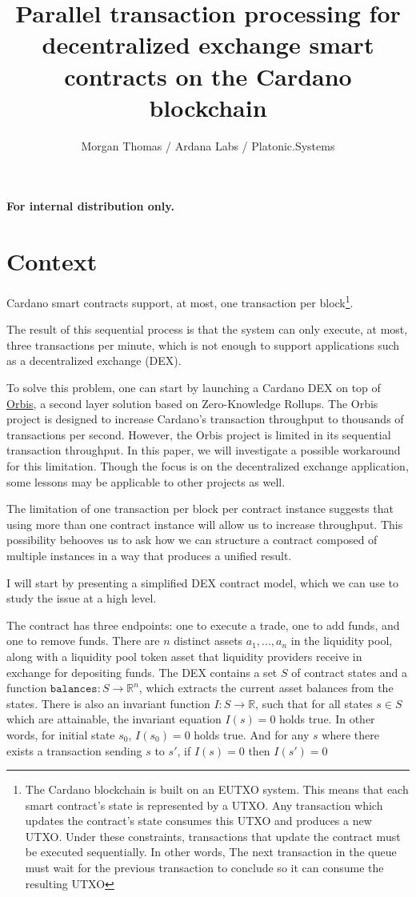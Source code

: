 \documentclass[12pt]{article}
\title{Parallel transaction processing for decentralized exchange smart contracts on the Cardano blockchain}
\author{Morgan Thomas / Ardana Labs / Platonic.Systems}
\begin{document}
\maketitle

\begin{center}
	\textbf{For internal distribution only.}
\end{center}

\section{Context}

Cardano smart contracts support, at most, one transaction per block\footnote{
  The Cardano blockchain is built on an EUTXO system.
  This means that each smart contract's state is represented by a UTXO.
  Any transaction which updates the contract's state consumes this UTXO and produces a
  new UTXO. Under these constraints, transactions that update the contract must be executed sequentially.
  In other words, The next transaction in the queue must wait for the previous
  transaction to conclude so it can consume the resulting UTXO}.
  
The result of this sequential process is that the system can only execute, at most, three transactions per minute, which is not enough to support applications such as a decentralized exchange (DEX).

To solve this problem, one can start by launching a Cardano DEX on top of
\href{https://orbisprotocol.com/}{Orbis}, a second layer solution based on
Zero-Knowledge Rollups.
The Orbis project is designed to increase Cardano's transaction throughput to thousands of
transactions per second.
However, the Orbis project is limited in its sequential transaction throughput.
In this paper, we will investigate a possible workaround for this limitation.
Though the focus is on the decentralized exchange application, some lessons may
be applicable to other projects as well.

The limitation of one transaction per block per contract instance suggests that using more than one contract instance will allow us to increase throughput.
This possibility behooves us to ask how we can structure a contract composed of multiple
instances in a way that produces a unified result.

I will start by presenting a simplified DEX contract model, which we can use to study the issue at a high level.

The contract has three endpoints: one to execute a trade, one to add funds, and one to remove funds. There are $n$ distinct assets $a_1,...,a_n$ in the liquidity pool, along with a liquidity pool token asset that liquidity providers receive in exchange for depositing funds. The DEX contains a set $S$ of contract states and a function $\texttt{balances} : S \to \mathbb{R}^n$,
which extracts the current asset balances from the states. There is also an invariant function $I : S \to \mathbb{R}$,
such that for all states $s \in S$ which are attainable, the invariant equation $I(s) = 0$ holds true.
In other words, for initial state $s_0$, $I(s_0) = 0$ holds true. And for any $s$ where there exists a transaction sending $s$ to $s'$, if $I(s) = 0$ then $I(s') = 0$
\end{document}
